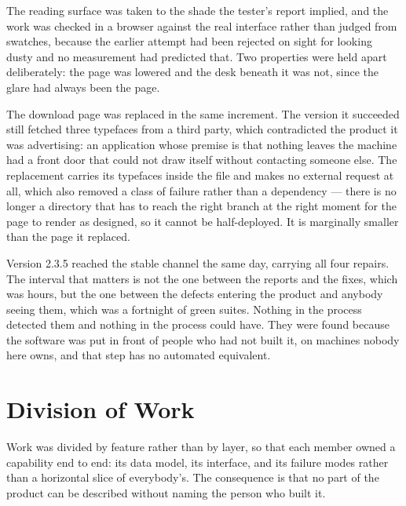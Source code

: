 \documentclass[11pt,a4paper]{article}
\begin{document}
The reading surface was taken to the shade the tester's report implied, and the
work was checked in a browser against the real interface rather than judged from
swatches, because the earlier attempt had been rejected on sight for looking
dusty and no measurement had predicted that. Two properties were held apart
deliberately: the page was lowered and the desk beneath it was not, since the
glare had always been the page.

The download page was replaced in the same increment. The version it succeeded
still fetched three typefaces from a third party, which contradicted the product
it was advertising: an application whose premise is that nothing leaves the
machine had a front door that could not draw itself without contacting someone
else. The replacement carries its typefaces inside the file and makes no
external request at all, which also removed a class of failure rather than a
dependency --- there is no longer a directory that has to reach the right branch
at the right moment for the page to render as designed, so it cannot be
half-deployed. It is marginally smaller than the page it replaced.

Version 2.3.5 reached the stable channel the same day, carrying all four
repairs. The interval that matters is not the one between the reports and the
fixes, which was hours, but the one between the defects entering the product and
anybody seeing them, which was a fortnight of green suites. Nothing in the
process detected them and nothing in the process could have. They were found
because the software was put in front of people who had not built it, on
machines nobody here owns, and that step has no automated equivalent.

\section{Division of Work}

Work was divided by feature rather than by layer, so that each member owned a
capability end to end: its data model, its interface, and its failure modes
rather than a horizontal slice of everybody's. The consequence is that no
part of the product can be described without naming the person who built it.
\end{document}
